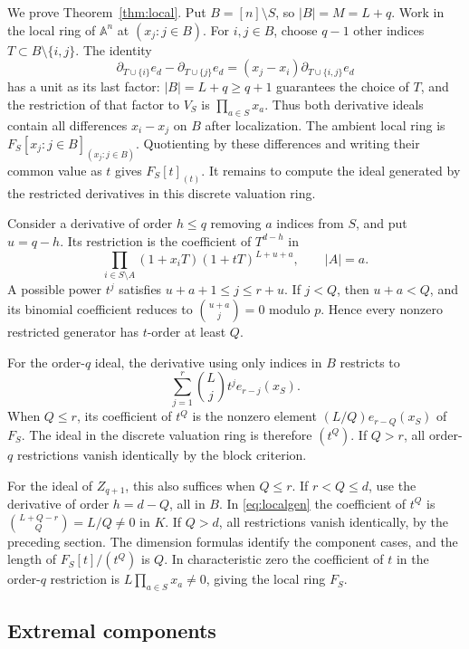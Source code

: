 \documentclass[11pt]{article}
\theoremstyle{remark}
\newcommand{\A}{\mathbb A}
\begin{document}
We prove Theorem~\ref{thm:local}. Put $B=[n]\setminus S$, so
$|B|=M=L+q$. Work in the local ring of $\A^n$ at
$(x_j:j\in B)$. For $i,j\in B$, choose $q-1$ other indices
$T\subset B\setminus\{i,j\}$. The identity
\begin{equation}
 \partial_{T\cup\{i\}}e_d-\partial_{T\cup\{j\}}e_d
 =(x_j-x_i)\partial_{T\cup\{i,j\}}e_d\label{eq:difference}
\end{equation}
has a unit as its last factor: $|B|=L+q\ge q+1$ guarantees the
choice of $T$, and the restriction of that factor to $V_S$ is
$\prod_{a\in S}x_a$. Thus both derivative ideals contain all
differences $x_i-x_j$ on $B$ after localization. The ambient local
ring is $F_S[x_j:j\in B]_{(x_j:j\in B)}$. Quotienting by these
differences and writing their common value as $t$ gives
$F_S[t]_{(t)}$. It remains to compute the ideal generated by the
restricted derivatives in this discrete valuation ring.

Consider a derivative of order $h\le q$ removing $a$ indices
from $S$, and put $u=q-h$. Its restriction is the coefficient
of $T^{d-h}$ in
\begin{equation}
 \prod_{i\in S\setminus A}(1+x_iT)(1+tT)^{L+u+a},
 \qquad |A|=a.\label{eq:localgen}
\end{equation}
A possible power $t^j$ satisfies $u+a+1\le j\le r+u$.
If $j<Q$, then $u+a<Q$, and its binomial coefficient reduces to
$\binom{u+a}{j}=0$ modulo $p$. Hence every nonzero restricted
generator has $t$-order at least $Q$.

For the order-$q$ ideal, the derivative using only indices in $B$
restricts to
\[
 \sum_{j=1}^r\binom Lj t^j e_{r-j}(x_S).
\]
When $Q\le r$, its coefficient of $t^Q$ is the nonzero element
$(L/Q)e_{r-Q}(x_S)$ of $F_S$. The ideal in the discrete valuation
ring is therefore $(t^Q)$. If $Q>r$, all order-$q$ restrictions
vanish identically by the block criterion.

For the ideal of $Z_{q+1}$, this also suffices when $Q\le r$.
If $r<Q\le d$, use the derivative of order $h=d-Q$, all in $B$.
In \eqref{eq:localgen} the coefficient of $t^Q$ is
$\binom{L+Q-r}{Q}=L/Q\ne0$ in $K$. If $Q>d$, all restrictions
vanish identically, by the preceding section. The dimension
formulas identify the component cases, and the length of
$F_S[t]/(t^Q)$ is $Q$. In characteristic zero the coefficient of
$t$ in the order-$q$ restriction is
$L\prod_{a\in S}x_a\ne0$, giving the local ring $F_S$.

\subsection{Extremal components}
\end{document}
